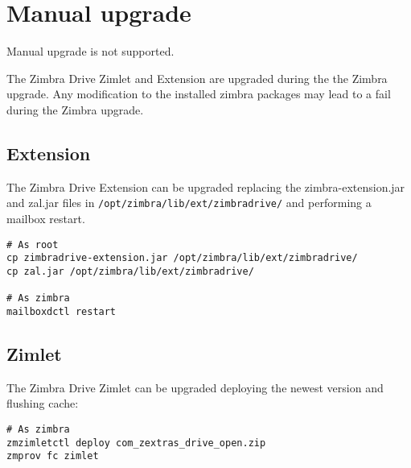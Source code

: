 \section{Manual upgrade}

\begin{comment}
WARNING:
\end{comment}
\begin{warning}
    Manual upgrade is not supported.

    The Zimbra Drive Zimlet and Extension are upgraded during the the Zimbra upgrade.
    Any modification to the installed zimbra packages may lead to a fail during the Zimbra upgrade.
\end{warning}

\subsection{Extension}
The Zimbra Drive Extension can be upgraded replacing the zimbra-extension.jar and zal.jar files in \texttt{/opt/zimbra/lib/ext/zimbradrive/} and performing a mailbox restart.
\begin{verbatim}
# As root
cp zimbradrive-extension.jar /opt/zimbra/lib/ext/zimbradrive/
cp zal.jar /opt/zimbra/lib/ext/zimbradrive/

# As zimbra
mailboxdctl restart
\end{verbatim}

\subsection{Zimlet}
The Zimbra Drive Zimlet can be upgraded deploying the newest version and flushing cache:
\begin{verbatim}
# As zimbra
zmzimletctl deploy com_zextras_drive_open.zip
zmprov fc zimlet
\end{verbatim}
